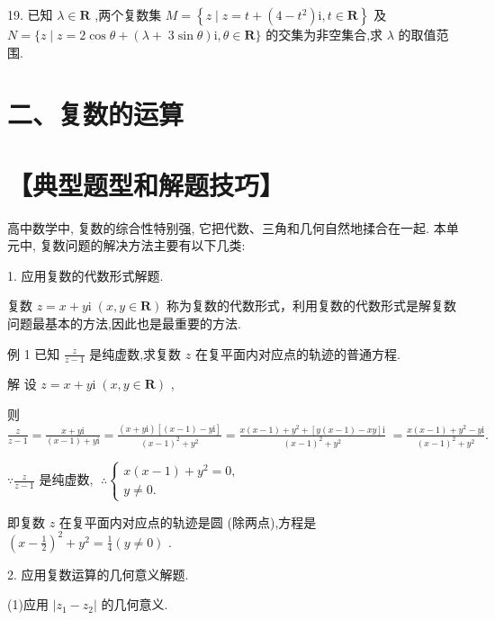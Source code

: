 \documentclass[10pt]{article}
\begin{document}
19. 已知 \(\lambda  \in  \mathbf{R}\) ,两个复数集 \(M = \left\{  {z \mid  z = t + \left( {4 - {t}^{2}}\right) \mathrm{i},t \in  \mathbf{R}}\right\}\) 及 \(N = \{ z \mid  z = 2\cos \theta  + (\lambda  + \; 3\sin \theta )\mathrm{i},\theta  \in  \mathbf{R}\}\) 的交集为非空集合,求 \(\lambda\) 的取值范围.

\section*{二、复数的运算}

\section*{【典型题型和解题技巧】}

高中数学中, 复数的综合性特别强, 它把代数、三角和几何自然地揉合在一起. 本单元中, 复数问题的解决方法主要有以下几类:

1. 应用复数的代数形式解题.

复数 \(z = x + y\mathrm{i}\;\left( {x,y \in  \mathbf{R}}\right)\) 称为复数的代数形式，利用复数的代数形式是解复数问题最基本的方法,因此也是最重要的方法.

例 1 已知 \(\frac{z}{z - 1}\) 是纯虚数,求复数 \(z\) 在复平面内对应点的轨迹的普通方程.

解 设 \(z = x + y\mathrm{i}\;\left( {x,y \in  \mathbf{R}}\right)\) ,

则 \(\frac{z}{z - 1} = \frac{x + y\mathrm{i}}{\left( {x - 1}\right)  + y\mathrm{i}} = \frac{\left( {x + y\mathrm{i}}\right) \left\lbrack  {\left( {x - 1}\right)  - y\mathrm{i}}\right\rbrack  }{{\left( x - 1\right) }^{2} + {y}^{2}} = \frac{x\left( {x - 1}\right)  + {y}^{2} + \left\lbrack  {y\left( {x - 1}\right)  - {xy}}\right\rbrack  \mathrm{i}}{{\left( x - 1\right) }^{2} + {y}^{2}} \; = \frac{x\left( {x - 1}\right)  + {y}^{2} - y\mathrm{i}}{{\left( x - 1\right) }^{2} + {y}^{2}}.\)

\(\because \frac{z}{z - 1}\) 是纯虚数, \(\;\therefore \left\{  \begin{array}{l} x\left( {x - 1}\right)  + {y}^{2} = 0, \\  y \neq  0. \end{array}\right.\)

即复数 \(z\) 在复平面内对应点的轨迹是圆 (除两点),方程是 \({\left( x - \frac{1}{2}\right) }^{2} + {y}^{2} = \frac{1}{4}\left( {y \neq  0}\right)\) .

2. 应用复数运算的几何意义解题.

(1)应用 \(\left| {{z}_{1} - {z}_{2}}\right|\) 的几何意义.
\end{document}

